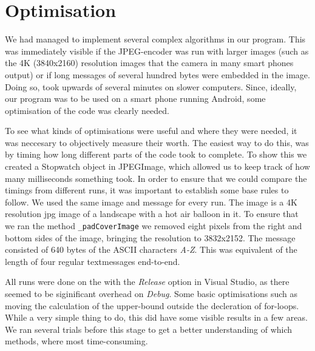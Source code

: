 \section{Optimisation}
We had managed to implement several complex algorithms in our program. 
This was immediately visible if the JPEG-encoder was run with larger images (such as the 4K (3840x2160) resolution images that the camera in many smart phones output) or if long messages of several hundred bytes were embedded in the image.
Doing so, took upwards of several minutes on slower computers.
Since, ideally, our program was to be used on a smart phone running Android, some optimisation of the code was clearly needed.

To see what kinds of optimisations were useful and where they were needed, it was neccesary to objectively measure their worth.
The easiest way to do this, was by timing how long different parts of the code took to complete.
To show this we created a Stopwatch object in JPEGImage, which allowed us to keep track of how many milliseconds something took.
In order to ensure that we could compare the timings from different runs, it was important to establish some base rules to follow.
We used the same image and message for every run. 
The image is a 4K resolution jpg image of a landscape with a hot air balloon in it. 
To ensure that we ran the method \lstinline|_padCoverImage| we removed eight pixels from the right and bottom sides of the image, bringing the resolution to 3832x2152.
The message consisted of 640 bytes of the ASCII characters \textit{A-Z}.
This was equivalent of the length of four regular textmessages end-to-end.

All runs were done on the with the \textit{Release} option in Visual Studio, as there seemed to be siginificant overhead on \textit{Debug}.
Some basic optimisations such as moving the calculation of the upper-bound outside the decleration of for-loops.
While a very simple thing to do, this did have some visible results in a few areas.
We ran several trials before this stage to get a better understanding of which methods, where most time-consuming.

